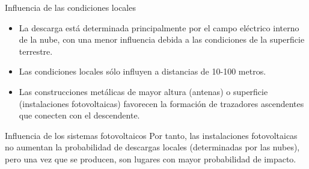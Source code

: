 \documentclass[xcolor={usenames,svgnames,dvipsnames}]{beamer}
\begin{document}
\begin{frame}[label={sec:org5cbe936}]{Influencia de las condiciones locales}
\begin{itemize}
\item \alert{La descarga está determinada principalmente por el campo eléctrico
interno de la nube}, con una menor influencia debida a las
condiciones de la superficie terrestre.

\item Las \alert{condiciones locales sólo influyen} a distancias de 10-100 metros.

\item Las \alert{construcciones metálicas de mayor altura} (antenas) o superficie
(instalaciones fotovoltaicas) favorecen la formación de trazadores
ascendentes que conecten con el descendente.
\end{itemize}
\end{frame}

\begin{frame}[label={sec:orgdb99734}]{Influencia de los sistemas fotovoltaicos}
Por tanto, \alert{las instalaciones fotovoltaicas no aumentan la probabilidad
de descargas locales} (determinadas por las nubes), pero una vez que se
producen, son lugares con mayor probabilidad de impacto.
\end{frame}
\end{document}

